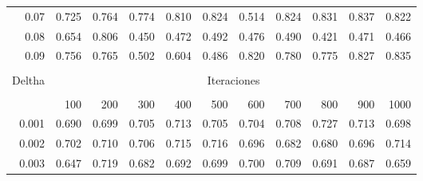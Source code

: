 \begin{table}[H]
\begin{tabular}{rrrrrrrrrrr}
0.07                       & 0.725                & 0.764                & 0.774                & 0.810                & 0.824                & 0.514                & 0.824                & 0.831                & 0.837                & 0.822                \\
0.08                       & 0.654                & 0.806                & 0.450                & 0.472                & 0.492                & 0.476                & 0.490                & 0.421                & 0.471                & 0.466                \\
0.09                       & 0.756                & 0.765                & 0.502                & 0.604                & 0.486                & 0.820                & 0.780                & 0.775                & 0.827                & 0.835                \\ \hline
\multicolumn{1}{l}{}       & \multicolumn{1}{l}{} & \multicolumn{1}{l}{} & \multicolumn{1}{l}{} & \multicolumn{1}{l}{} & \multicolumn{1}{l}{} & \multicolumn{1}{l}{} & \multicolumn{1}{l}{} & \multicolumn{1}{l}{} & \multicolumn{1}{l}{} & \multicolumn{1}{l}{} \\
\multicolumn{1}{l}{Deltha} & \multicolumn{10}{c}{Iteraciones}   \\ \hline                                                                                                                                                                                                   \\
\multicolumn{1}{l}{}       & 100                  & 200                  & 300                  & 400                  & 500                  & 600                  & 700                  & 800                  & 900                  & 1000                 \\
0.001                      & 0.690                & 0.699                & 0.705                & 0.713                & 0.705                & 0.704                & 0.708                & 0.727                & 0.713                & 0.698                \\
0.002                      & 0.702                & 0.710                & 0.706                & 0.715                & 0.716                & 0.696                & 0.682                & 0.680                & 0.696                & 0.714                \\
0.003                      & 0.647                & 0.719                & 0.682                & 0.692                & 0.699                & 0.700                & 0.709                & 0.691                & 0.687                & 0.659                \\

\end{tabular}
\end{table}
